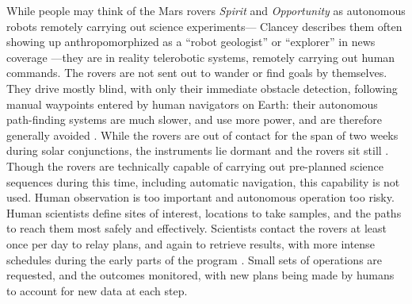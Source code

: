 While people may
think of the Mars rovers \emph{Spirit} and \emph{Opportunity} as
autonomous robots remotely carrying out science experiments---
Clancey describes them often showing up anthropomorphized as a ``robot
geologist'' or 
``explorer'' in news coverage \cite[p. 7]{clancey}---they are
in reality telerobotic systems, remotely carrying out human commands.
The rovers are not 
sent out to wander or find goals by themselves. They drive mostly
blind, with only their immediate obstacle detection, following manual
waypoints entered by human navigators on Earth: their autonomous
path-finding systems are much slower, and use more power, and are
therefore generally avoided \cite[p. 118]{clancey}. While the rovers
are out of contact for the span of two weeks during solar
conjunctions, the instruments lie dormant and the rovers sit
still \cite[p. 25]{clancey}. Though the rovers are technically capable of
carrying out pre-planned science sequences during this time, including
automatic navigation, this capability is not used. Human observation
is too important and
autonomous operation too risky. Human
scientists define sites of interest, locations to take samples, and
the paths to reach them most safely and effectively. Scientists
contact the rovers at least once per day to relay plans, and again
to retrieve results, with more intense schedules during the early
parts of the program \cite[p. 58]{clancey}. Small sets of
operations are requested, and the outcomes monitored, with new plans
being made by humans to account for new data at each step.

